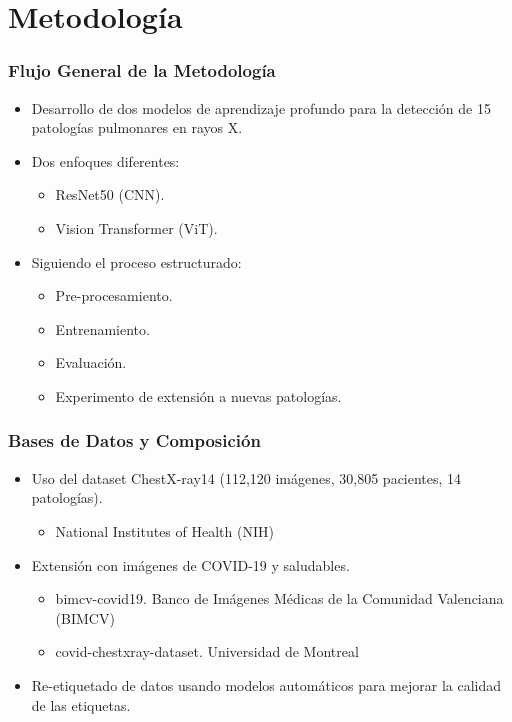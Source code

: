 
\section{Metodología}

\begin{frame}
\frametitle{Flujo General de la Metodología}
\begin{itemize}
    \item Desarrollo de dos modelos de aprendizaje profundo para la detección de 15 patologías pulmonares en rayos X.
    \item Dos enfoques diferentes:
    \begin{itemize}
        \item ResNet50 (CNN).
        \item Vision Transformer (ViT).
    \end{itemize}
    \item Siguiendo el proceso estructurado:
    \begin{itemize}
        \item Pre-procesamiento.
        \item Entrenamiento.
        \item Evaluación.
        \item Experimento de extensión a nuevas patologías.
    \end{itemize}
\end{itemize}
\end{frame}

\begin{frame}
\frametitle{Bases de Datos y Composición}
\begin{itemize}
    \item Uso del dataset ChestX-ray14 (112,120 imágenes, 30,805 pacientes, 14 patologías).
    \begin{itemize}
        \item National Institutes of Health (NIH)
    \end{itemize}
    \item Extensión con imágenes de COVID-19 y saludables.
    \begin{itemize}
        \item bimcv-covid19. Banco de Imágenes Médicas de la Comunidad Valenciana (BIMCV)
        \item covid-chestxray-dataset. Universidad de Montreal
    \end{itemize}
    \item Re-etiquetado de datos usando modelos automáticos para mejorar la calidad de las etiquetas.
\end{itemize}
\end{frame}

